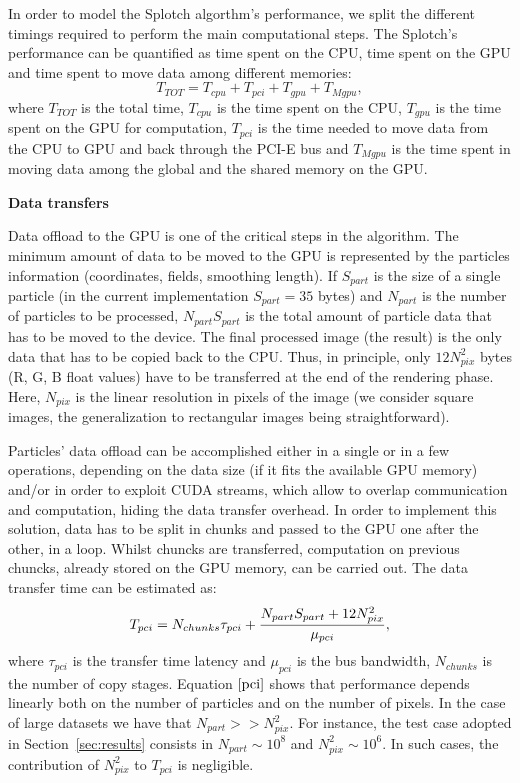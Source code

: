 \documentclass[11pt]{article}
\begin{document}
In order to model the Splotch algorthm's performance, we split the different timings
required to perform the main computational steps. 
The Splotch's performance can be quantified as time spent on the CPU, time spent on the GPU
and time spent to move data among different memories:
\begin{equation}\label{Ts}
T_{TOT} = T_{cpu} + T_{pci} + T_{gpu} + T_{Mgpu},
\end{equation}
where $T_{TOT}$ is the total time, 
$T_{cpu}$ is the time spent on the CPU, $T_{gpu}$ is the time
spent on the GPU for computation, $T_{pci}$ is the time needed to move data from
the CPU to GPU and back through the PCI-E bus and $T_{Mgpu}$ is the time 
spent in moving data among the global and the shared memory on the GPU.

\medskip
\noindent
{\bf Data transfers}

\noindent
Data offload to the GPU is one of the critical steps in the algorithm. 
The minimum amount of data 
to be moved to the GPU is represented by the particles information 
(coordinates, fields, smoothing length). If $S_{part}$ is the
size of a single particle (in the current implementation $S_{part}=35$ bytes) and 
$N_{part}$ is the number of particles to be processed,
$N_{part} S_{part}$ is the total amount of particle data that has to be moved to the device.
The final processed image (the result) is the only data that has to be copied back to
the CPU. Thus, in principle, only $12 N_{pix}^2$ bytes (R, G, B float values) have to be transferred at
the end of the rendering phase. Here, $N_{pix}$ is the linear resolution in pixels of the 
image (we consider square images, the generalization to rectangular images being
straightforward). 

Particles' data offload can be accomplished either in a single or in a few operations, 
depending on the data size (if it fits the available GPU memory) and/or
in order to exploit CUDA streams, which allow to overlap communication 
and computation, hiding the data transfer overhead.  
In order to implement this solution, data has to be
split in chunks and passed to the GPU one after the other, in a loop. Whilst chuncks 
are transferred, computation on previous chuncks, already stored on the GPU
memory, can be carried out. 
The data transfer time can be estimated as:
\begin{equation}\label{pci}
T_{pci} =  N_{chunks} \tau_{pci} + {N_{part} S_{part} + 12 N_{pix}^2 \over 
\mu_{pci}},
\end{equation}
where $\tau_{pci}$ is the transfer time latency and $\mu_{pci}$ is the
bus bandwidth, $N_{chunks}$ is the number 
of copy stages. 
Equation $\eqref{pci}$ shows that performance
depends linearly both on the number of particles and on the number of pixels.
In the case of large datasets we have that
$N_{part} >> N_{pix}^2$. For instance, the test case adopted
in Section~\ref{sec:results} consists in $N_{part} \sim 10^8$
and $N_{pix}^2 \sim 10^6$. In such cases, the contribution of $N_{pix}^2$
to $T_{pci}$ is negligible.
\end{document}
